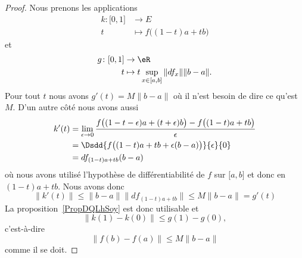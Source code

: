\begin{proof}
	Nous prenons les applications
	\begin{equation}
		\begin{aligned}
			k\colon \mathopen[ 0 , 1 \mathclose] & \to E                          \\
			t                                    & \mapsto f\big( (1-t)a+tb \big)
		\end{aligned}
	\end{equation}
	et
	\begin{equation}
		\begin{aligned}
			g\colon \mathopen[ 0 , 1 \mathclose] & \to \eR                                                              \\
			t                                    & \mapsto t\sup_{x\in\mathopen[ a , b \mathclose]}\| df_x \|\| b-a \|.
		\end{aligned}
	\end{equation}
	Pour tout \( t\) nous avons \( g'(t)=M\| b-a \|\) où il n'est besoin de dire ce qu'est \( M\). D'un autre côté nous avons aussi
	\begin{equation}
		\begin{aligned}[]
			k'(t) & =\lim_{\epsilon\to 0}\frac{ f\big( (1-t-\epsilon)a+(t+\epsilon)b \big)-f\big( (1-t)a+tb \big) }{ \epsilon } \\
			      & =\Dsdd{ f\big( (1-t)a+tb+\epsilon(b-a) \big)  }{\epsilon}{0}                                                \\
			      & =df_{(1-t)a+tb}(b-a)
		\end{aligned}
	\end{equation}
	où nous avons utilisé l'hypothèse de différentiabilité de \( f\) sur \( \mathopen[ a , b \mathclose]\) et donc en \( (1-t)a+tb\). Nous avons donc
	\begin{equation}
		\| k'(t) \|\leq \| b-a \|\| df_{(1-t)a+tb} \|\leq M\| b-a \|=g'(t)
	\end{equation}
	La proposition~\ref{PropDQLhSoy} est donc utilisable et
	\begin{equation}
		\| k(1)-k(0) \|\leq g(1)-g(0),
	\end{equation}
	c'est-à-dire
	\begin{equation}
		\| f(b)-f(a) \|\leq M\| b-a \|
	\end{equation}
	comme il se doit.
\end{proof}

